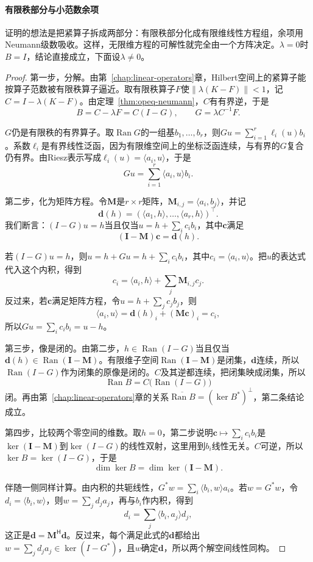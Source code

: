 \paragraph{有限秩部分与小范数余项}
证明的想法是把紧算子拆成两部分：有限秩部分化成有限维线性方程组，余项用Neumann级数吸收。这样，无限维方程的可解性就完全由一个方阵决定。$\lambda=0$时$B=I$，结论直接成立，下面设$\lambda\neq0$。

\begin{proof}
第一步，分解。由第~\ref{chap:linear-operators}章，Hilbert空间上的紧算子能按算子范数被有限秩算子逼近。取有限秩算子$F$使$\lVert\lambda(K-F)\rVert<1$，记$C=I-\lambda(K-F)$。由定理~\ref{thm:opeq-neumann}，$C$有有界逆，于是
\[
  B=C-\lambda F=C(I-G),\qquad G=\lambda C^{-1}F.
\]

$G$仍是有限秩的有界算子。取$\operatorname{Ran}G$的一组基$b_1,\ldots,b_r$，则$Gu=\sum_{i=1}^r\ell_i(u)b_i$。系数$\ell_i$是有界线性泛函，因为有限维空间上的坐标泛函连续，与有界的$G$复合仍有界。由Riesz表示写成$\ell_i(u)=\langle a_i,u\rangle$，于是
\[
  Gu=\sum_{i=1}^r\langle a_i,u\rangle b_i.
\]

第二步，化为矩阵方程。令$\bm M$是$r\times r$矩阵，$\bm M_{i,j}=\langle a_i,b_j\rangle$，并记
\[
  \bm d(h)=(\langle a_1,h\rangle,\ldots,\langle a_r,h\rangle)^\top.
\]
我们断言：$(I-G)u=h$当且仅当$u=h+\sum_ic_ib_i$，其中$\bm c$满足
\[
  (\bm I-\bm M)\bm c=\bm d(h).
\]

若$(I-G)u=h$，则$u=h+Gu=h+\sum_ic_ib_i$，其中$c_i=\langle a_i,u\rangle$。把$u$的表达式代入这个内积，得到
\[
  c_i=\langle a_i,h\rangle+\sum_j\bm M_{i,j}c_j.
\]
反过来，若$\bm c$满足矩阵方程，令$u=h+\sum_jc_jb_j$，则
\[
  \langle a_i,u\rangle=\bm d(h)_i+(\bm M\bm c)_i=c_i,
\]
所以$Gu=\sum_ic_ib_i=u-h$。

第三步，像是闭的。由第二步，$h\in\operatorname{Ran}(I-G)$当且仅当$\bm d(h)\in\operatorname{Ran}(\bm I-\bm M)$。有限维子空间$\operatorname{Ran}(\bm I-\bm M)$是闭集，$\bm d$连续，所以$\operatorname{Ran}(I-G)$作为闭集的原像是闭的。$C$及其逆都连续，把闭集映成闭集，所以
\[
  \operatorname{Ran}B=C\bigl(\operatorname{Ran}(I-G)\bigr)
\]
闭。再由第~\ref{chap:linear-operators}章的关系$\overline{\operatorname{Ran}B}=(\ker B^*)^\perp$，第二条结论成立。

第四步，比较两个零空间的维数。取$h=0$，第二步说明$\bm c\mapsto\sum_ic_ib_i$是$\ker(\bm I-\bm M)$到$\ker(I-G)$的线性双射，这里用到$b_i$线性无关。$C$可逆，所以$\ker B=\ker(I-G)$，于是
\[
  \dim\ker B=\dim\ker(\bm I-\bm M).
\]

伴随一侧同样计算。由内积的共轭线性，$G^*w=\sum_i\langle b_i,w\rangle a_i$。若$w=G^*w$，令$d_i=\langle b_i,w\rangle$，则$w=\sum_jd_ja_j$，再与$b_i$作内积，得到
\[
  d_i=\sum_j\langle b_i,a_j\rangle d_j,
\]
这正是$\bm d=\bm M^{\mathsf H}\bm d$。反过来，每个满足此式的$\bm d$都给出$w=\sum_jd_ja_j\in\ker(I-G^*)$，且$w$确定$\bm d$，所以两个解空间线性同构。


\end{proof}
